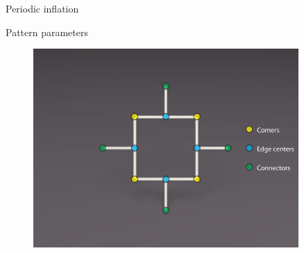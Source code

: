 \begin{frame}{Periodic inflation}
\end{frame}

\begin{frame}{Pattern parameters}
\begin{figure}
\includegraphics[width=0.9\textwidth]{Images/box_2D_parameters.pdf}
\end{figure}
\end{frame}

